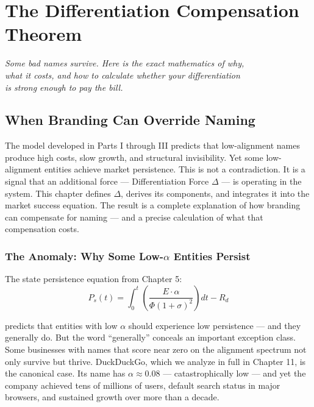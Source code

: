 \documentclass[12pt, openany]{book}
\theoremstyle{thmstyle}
\theoremstyle{defstyle}
\begin{document}
\tableofcontents
\newpage

\part{The Differentiation Compensation Theorem}

\vspace{16pt}
\begin{center}
\color{accentgray}\itshape
Some bad names survive. Here is the exact mathematics of why,\\
what it costs, and how to calculate whether your differentiation\\
is strong enough to pay the bill.
\end{center}

\chapter{When Branding Can Override Naming}

\begin{keybox}
The model developed in Parts I through III predicts that low-alignment names produce high costs, slow growth, and structural invisibility. Yet some low-alignment entities achieve market persistence. This is not a contradiction. It is a signal that an additional force --- Differentiation Force $\Delta$ --- is operating in the system. This chapter defines $\Delta$, derives its components, and integrates it into the market success equation. The result is a complete explanation of how branding can compensate for naming --- and a precise calculation of what that compensation costs.
\end{keybox}

\section{The Anomaly: Why Some Low-$\alpha$ Entities Persist}

The state persistence equation from Chapter 5:
\[
P_s(t) = \int_0^t \left(\frac{E \cdot \alpha}{\Phi(1+\sigma)^2}\right) dt - R_d
\]

predicts that entities with low $\alpha$ should experience low persistence --- and they generally do. But the word ``generally'' conceals an important exception class. Some businesses with names that score near zero on the alignment spectrum not only survive but thrive. DuckDuckGo, which we analyze in full in Chapter 11, is the canonical case. Its name has $\alpha \approx 0.08$ --- catastrophically low --- and yet the company achieved tens of millions of users, default search status in major browsers, and sustained growth over more than a decade.
\end{document}
